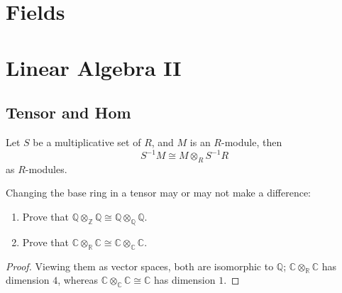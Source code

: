 \documentclass[openany]{book}
\newcommand{\R}{\mathbb{R}}
\newcommand{\C}{\mathbb{C}}
\newcommand{\Q}{\mathbb{Q}}
\begin{document}
\chapter{Fields}













































\chapter{Linear Algebra II}



\section{Tensor and Hom}
\begin{prop}
    Let $S$ be a multiplicative set of $R$, and $M$ is an $R$-module, then 
    \begin{equation*}
        S^{-1}M\cong M\otimes_R S^{-1}R
    \end{equation*}
    as $R$-modules.
\end{prop}

\begin{prob}[2.7]
    Changing the base ring in a tensor may or may not make a difference:
    
    \begin{enumerate}
        \item Prove that \( \mathbb{Q} \otimes_{\mathbb{Z}} \mathbb{Q} \cong \mathbb{Q} \otimes_{\mathbb{Q}} \mathbb{Q} \).
        \item Prove that \( \mathbb{C} \otimes_{\mathbb{R}} \mathbb{C} \cong \mathbb{C} \otimes_{\mathbb{C}} \mathbb{C} \).
    \end{enumerate}
    \end{prob}
\begin{proof}
    Viewing them as vector spaces, both are isomorphic to $\Q$; $\C\otimes_\R\C$ has dimension $4$, whereas $\C\otimes_\C\C\cong\C$ has dimension $1$.
\end{proof}
    
\end{document}
